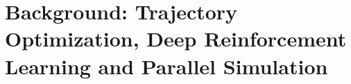 \section{Background: Trajectory Optimization, Deep Reinforcement Learning and Parallel Simulation}
\cite{rl:bellman1957markovian}
\cite{rl:bellman1960dynamic}
\cite{rl:rumelhart1986learning}
\cite{rl:kakade2001natural}
\cite{rl:peters2005natural}
\cite{rl:degris2012off}
\cite{rl:schulman2015trust}
\cite{rl:schulman2017proximal}
\cite{rl:pardo2018time}
\cite{rl:haarnoja2018soft}
\cite{rl:makoviychuk2021isaac}
\cite{rl:rudin2022learning}
\cite{rl:schneider2023learning}
\cite{rl:mujocoaccelereted2023}
\cite{rl:miki2024learning}

\cite{frameworks::horizon_to}
